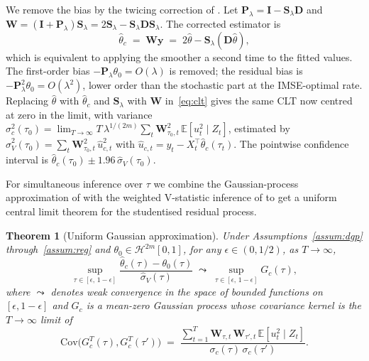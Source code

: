 \documentclass[12pt]{article}
\newcommand{\E}{\mathbb{E}}
\newcommand{\calH}{\mathcal{H}}
\newcommand{\bfy}{\mathbf{y}}
\newcommand{\bfS}{\mathbf{S}}
\newcommand{\bfD}{\mathbf{D}}
\newcommand{\bfP}{\mathbf{P}}
\newcommand{\bfI}{\mathbf{I}}
\newcommand{\bfW}{\mathbf{W}}
\newtheorem{theorem}{Theorem}
\begin{document}
We remove the bias by the twicing correction of \citet{GaoTsay2024}. Let $\bfP_\lambda = \bfI - \bfS_\lambda \bfD$ and $\bfW = (\bfI + \bfP_\lambda)\bfS_\lambda = 2\bfS_\lambda - \bfS_\lambda\bfD\bfS_\lambda$. The corrected estimator is
\begin{equation}\label{eq:twicing}
  \hat\theta_c \;=\; \bfW\bfy \;=\; 2\hat\theta - \bfS_\lambda(\bfD\hat\theta),
\end{equation}
which is equivalent to applying the smoother a second time to the fitted values. The first-order bias $-\bfP_\lambda \theta_0 = O(\lambda)$ is removed; the residual bias is $-\bfP_\lambda^2 \theta_0 = O(\lambda^2)$, lower order than the stochastic part at the IMSE-optimal rate. Replacing $\hat\theta$ with $\hat\theta_c$ and $\bfS_\lambda$ with $\bfW$ in~\eqref{eq:clt} gives the same CLT now centred at zero in the limit, with variance $\sigma_c^2(\tau_0) = \lim_{T \to \infty} T\, \lambda^{1/(2m)} \sum_t \bfW_{\tau_0, t}^2\, \E[u_t^2 \mid Z_t]$, estimated by $\hat\sigma_V^2(\tau_0) = \sum_t \bfW_{\tau_0,t}^2\, \hat u_{c,t}^2$ with $\hat u_{c,t} = y_t - X_t^\top \hat\theta_c(\tau_t)$. The pointwise confidence interval is $\hat\theta_c(\tau_0) \pm 1.96\, \hat\sigma_V(\tau_0)$.

For simultaneous inference over $\tau$ we combine the Gaussian-process approximation of \citet{ZhouWu2010} with the weighted V-statistic inference of \citet{Zhou2014} to get a uniform central limit theorem for the studentised residual process.

\begin{theorem}[Uniform Gaussian approximation]\label{thm:uniform}
Under Assumptions~\ref{assum:dgp} through~\ref{assum:reg} and $\theta_0 \in \calH^{2m}[0,1]$, for any $\epsilon \in (0, 1/2)$, as $T \to \infty$,
\[
  \sup_{\tau \in [\epsilon,\, 1-\epsilon]} \frac{\hat\theta_c(\tau) - \theta_0(\tau)}{\hat\sigma_V(\tau)}
  \;\leadsto\;
  \sup_{\tau \in [\epsilon,\, 1-\epsilon]} G_c(\tau),
\]
where $\leadsto$ denotes weak convergence in the space of bounded functions on $[\epsilon, 1-\epsilon]$ and $G_c$ is a mean-zero Gaussian process whose covariance kernel is the $T \to \infty$ limit of
\[
  \mathrm{Cov}\bigl(G_c^T(\tau), G_c^T(\tau')\bigr) \;=\; \frac{\sum_{t=1}^T \bfW_{\tau,t}\, \bfW_{\tau',t}\, \E[u_t^2 \mid Z_t]}{\sigma_c(\tau)\, \sigma_c(\tau')}.
\]
\end{theorem}
\end{document}
